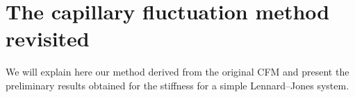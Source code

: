 \chapter{The capillary fluctuation method revisited}
\label{ch:CFM}

%    
%    
%    

We will explain here our method derived from the original CFM and present the preliminary results obtained for the stiffness for a simple Lennard--Jones system.


